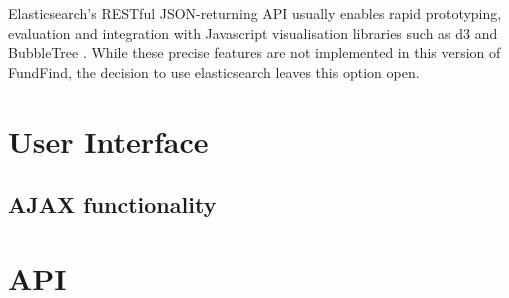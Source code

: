  
 Elasticsearch's RESTful JSON-returning API usually enables rapid prototyping, evaluation and integration with Javascript visualisation libraries such as d3 \cite{d3} and BubbleTree \cite{bubbletree}. While these precise features are not implemented in this version of FundFind, the decision to use elasticsearch leaves this option open.
 
 

\section{User Interface}
\subsection{AJAX functionality}
\label{design-ajax}

\section{API}
